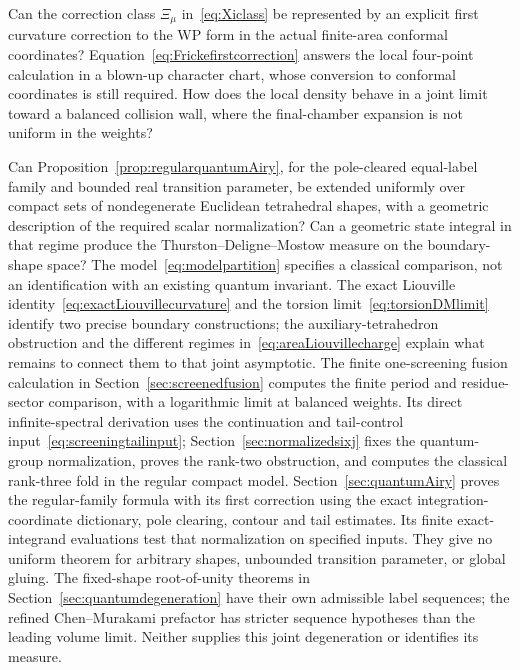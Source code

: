 \begin{question}
Can the correction class $\Xi_\mu$ in~\eqref{eq:Xiclass} be represented
by an explicit first curvature correction to the WP form in
the actual finite-area conformal coordinates? Equation~\eqref{eq:Frickefirstcorrection}
answers the local four-point calculation in a blown-up character chart,
whose conversion to conformal coordinates is still required.
How does the local density behave
in a joint limit toward a balanced collision wall, where the
final-chamber expansion is not uniform in the weights?
\end{question}

\begin{question}
Can Proposition~\ref{prop:regularquantumAiry}, for the pole-cleared
equal-label family and bounded real transition parameter, be extended
uniformly over compact sets of nondegenerate Euclidean tetrahedral
shapes, with a geometric description of the required scalar normalization?
Can a geometric state
integral in that regime produce the Thurston--Deligne--Mostow measure
on the boundary-shape space? The model~\eqref{eq:modelpartition}
specifies a classical comparison, not an identification with an
existing quantum invariant. The exact Liouville
identity~\eqref{eq:exactLiouvillecurvature} and the torsion
limit~\eqref{eq:torsionDMlimit} identify two precise boundary
constructions; the auxiliary-tetrahedron obstruction and the
different regimes in~\eqref{eq:areaLiouvillecharge} explain
what remains to connect them to that joint asymptotic.
The finite one-screening fusion calculation in
Section~\ref{sec:screenedfusion} computes the finite period and
residue-sector comparison, with a logarithmic limit at balanced
weights. Its direct infinite-spectral derivation uses the
continuation and tail-control input~\eqref{eq:screeningtailinput};
Section~\ref{sec:normalizedsixj} fixes the quantum-group
normalization, proves the rank-two obstruction, and computes
the classical rank-three fold in the regular compact model.
Section~\ref{sec:quantumAiry} proves the regular-family formula with
its first correction using the exact integration-coordinate dictionary,
pole clearing, contour and tail estimates. Its finite exact-integrand
evaluations test that normalization on specified inputs. They give no
uniform theorem for arbitrary shapes, unbounded transition parameter,
or global gluing. The fixed-shape root-of-unity theorems in
Section~\ref{sec:quantumdegeneration} have their own admissible label
sequences; the refined Chen--Murakami prefactor has stricter sequence
hypotheses than the leading volume limit. Neither supplies this joint
degeneration or identifies its measure.
\end{question}

